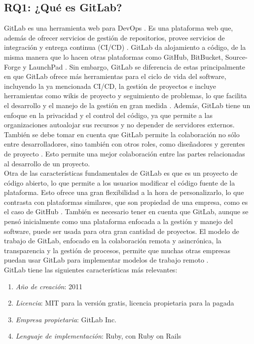 \documentclass[runningheads]{llncs}
\begin{document}
\subsection{RQ1: ¿Qué es GitLab?}
GitLab es una herramienta web para DevOps \cite{gitlab2022gitlab}. Es una plataforma web que, además de ofrecer
servicios de gestión de repositorios, provee servicios de integración y entrega continua (CI/CD) \cite{fairbanks2023analyzing}.
GitLab da alojamiento a código, de la misma manera que lo hacen otras plataformas como GitHub, BitBucket, Source-Forge
y LaunchPad \cite{safari2020structural}. Sin embargo, GitLab se diferencia de estas principalmente en que GitLab ofrece más
herramientas para el ciclo de vida del software, incluyendo la ya mencionada CI/CD, la gestión de proyectos e incluye
herramientas como wikis de proyecto y seguimiento de problemas, lo que facilita el desarrollo y el manejo de la gestión
en gran medida \cite{safari2020structural}. Además, GitLab tiene un enfoque en la privacidad y el control del código, ya que
permite a las organizaciones autoalojar sus recursos y no depender de servidores externos. También se debe tomar en cuenta que
GitLab permite la colaboración no sólo entre desarrolladores, sino también con otros roles, como diseñadores y
gerentes de proyecto \cite{choudhury2020gitlab}. Esto permite una mejor colaboración entre las partes relacionadas al
desarrollo de un proyecto.\\
Otra de las características fundamentales de GitLab es que es un proyecto de código abierto, lo que permite a los usuarios
modificar el código fuente de la plataforma. Esto ofrece una gran flexibilidad a la hora de personalizarlo, lo que contrasta
con plataformas similares, que son propiedad de una empresa, como es el caso de GitHub \cite{safari2020structural}. También es
necesario tener en cuenta que GitLab, aunque se pensó inicialmente como una plataforma enfocada a la gestión y manejo del software,
puede ser usada para otra gran cantidad de proyectos. El modelo de trabajo de GitLab, enfocado en la colaboración remota y asincrónica,
la transparencia y la gestión de procesos, permite que muchas otras empresas puedan usar GitLab para implementar modelos de
trabajo remoto \cite{choudhury2020gitlab}.\\
GitLab tiene las siguientes características más relevantes:
\begin{enumerate}
        \item \textit{Año de creación}: 2011
        \item \textit{Licencia}: MIT para la versión gratis, licencia propietaria para la pagada
        \item \textit{Empresa propietaria}: GitLab Inc.
        \item \textit{Lenguaje de implementación}: Ruby, con Ruby on Rails
\end{enumerate}
\end{document}
